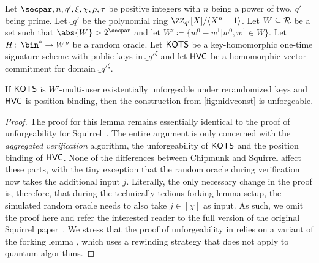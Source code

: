 \begin{lemma}\label{lem:msigunf}
Let $\secpar,n,q',\xi,\chi,\rho,\tau$ be positive integers with $n$ being a power of two, $q'$ being prime.
Let $\ring_{q'}$ be the polynomial ring $\defringqq$.
Let $W \subseteq \mathcal{R}$ be a set such that $\abs{W} > 2^\secpar$ and let $W' \coloneqq \{w^0-w^1| w^0,w^1 \in W\}$.
Let $H\colon\, \bin^* \to W^\rho$ be a random oracle.
Let $\mathsf{KOTS}$ be a key-homomorphic one-time signature scheme with public keys in $\ring_{q'}^\xi$ and let $\mathsf{HVC}$ be a homomorphic vector commitment for domain $\ring_{q'}^\xi$.

If $\mathsf{KOTS}$ is $W'$-multi-user existentially unforgeable under rerandomized keys and $\mathsf{HVC}$ is position-binding, then the construction from \autoref{fig:nidvconst} is unforgeable.
\end{lemma}

\begin{proof}
  The proof for this lemma remains essentially identical to the proof of unforgeability for Squirrel~\cite{CCS:FleSimZha22}.
  The entire argument is only concerned with the \emph{aggregated verification} algorithm, the unforgeability of $\mathsf{KOTS}$ and the position binding of $\mathsf{HVC}$.
  None of the differences between Chipmunk and Squirrel affect these parts, with the tiny exception that the random oracle during verification now takes the additional input $j$.
  Literally, the only necessary change in the proof is, therefore, that during the technically tedious forking lemma setup, the simulated random oracle needs to also take $j\in[\chi]$ as input.
  As such, we omit the proof here and refer the interested reader to the full version of the original Squirrel paper~\cite{EPRINT:FleSimZha22}.
  We stress that the proof of unforgeability in \cite{EPRINT:FleSimZha22} relies on a variant \cite{CCS:BelNev06} of the forking lemma \cite{EC:PoiSte96}, which uses a rewinding strategy that does not apply to quantum algorithms.
\end{proof}
